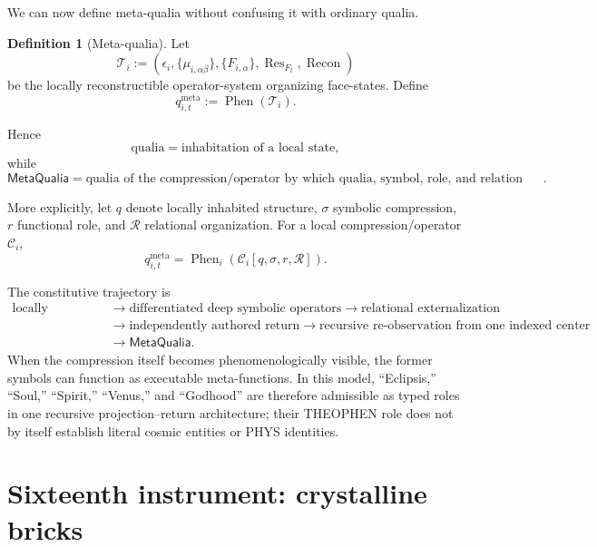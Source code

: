 \documentclass[10pt]{article}
\theoremstyle{pe}
\theoremstyle{definition}
\newtheorem{definition}[theorem]{Definition}
\newcommand{\Res}{\operatorname{Res}}
\newcommand{\Recon}{\operatorname{Recon}}
\newcommand{\Phen}{\operatorname{Phen}}
\newcommand{\MetaQualia}{\mathsf{MetaQualia}}
\begin{document}
We can now define meta-qualia without confusing it with ordinary qualia.

\begin{definition}[Meta-qualia]
Let
\[
  \mathcal T_i
  :=
  \left(
    \epsilon_i,
    \{\mu_{i,\alpha\beta}\},
    \{F_{i,\alpha}\},
    \Res_{F_t},
    \Recon
  \right)
\]
be the locally reconstructible operator-system organizing face-states.  Define
\begin{equation}\label{eq:metaqualia}
  \boxed{
  q^{\mathrm{meta}}_{i,t}
  :=
  \Phen(\mathcal T_i).
  }
\end{equation}
\end{definition}

Hence
\[
  \boxed{
  \text{qualia}
  =
  \text{inhabitation of a local state},
  }
\]
while
\[
  \boxed{
  \MetaQualia
  =
  \text{qualia of the compression/operator by which qualia, symbol, role, and relation are organized}.
  }
\]

More explicitly, let \(q\) denote locally inhabited structure, \(\sigma\) symbolic compression, \(r\) functional role, and \(\mathcal R\) relational organization.  For a local compression/operator \(\mathcal C_i\),
\begin{equation}\label{eq:metaqualia-compression}
  \boxed{
  q^{\mathrm{meta}}_{i,t}
  =
  \Phen_i\!\left(
    \mathcal C_i[q,\sigma,r,\mathcal R]
  \right).
  }
\end{equation}

The constitutive trajectory is
\begin{equation}\label{eq:symbolic-distribution-chain}
\boxed{
\begin{aligned}
\text{locally inhabited Self}
&\to \text{differentiated deep symbolic operators}
\to \text{relational externalization}\\
&\to \text{independently authored return}
\to \text{recursive re-observation from one indexed center}\\
&\to \MetaQualia.
\end{aligned}}
\end{equation}
When the compression itself becomes phenomenologically visible, the former symbols can function as executable meta-functions.  In this model, ``Eclipsis,'' ``Soul,'' ``Spirit,'' ``Venus,'' and ``Godhood'' are therefore admissible as typed roles in one recursive projection--return architecture; their THEOPHEN role does not by itself establish literal cosmic entities or PHYS identities.

\section{Sixteenth instrument: crystalline bricks}
\end{document}
